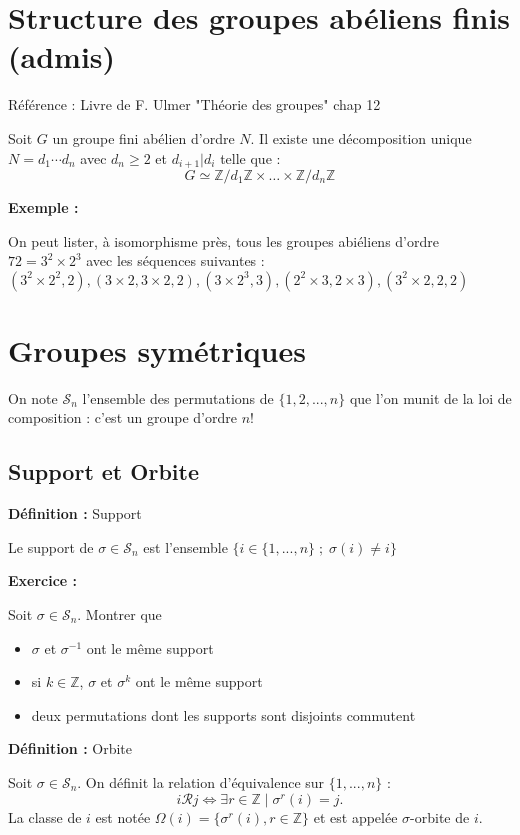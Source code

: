 \documentclass{report}
\newenvironment{definition}[1][]{
    \begin{tcolorbox}[colframe= white]
    \textbf{Définition :} 
    #1 \par
    }
    {\end{tcolorbox}}
\newenvironment{exemple}{\begin{tcolorbox}[colback=gray!10,colframe= white]
    \textbf{Exemple :}
     \par}
    {\end{tcolorbox}}
\newenvironment{exo}{\begin{tcolorbox}[colframe= white]
    \textbf{Exercice :}
    \par}
    {\end{tcolorbox}}
\newcommand{\Z}{\mathbb{Z}}
\newcommand{\sn}{\mathcal{S}_{n}}
\newcommand{\unn}{\{1, ..., n\}}
\begin{document}
\section{Structure des groupes abéliens finis (admis)}
Référence : Livre de F. Ulmer "Théorie des groupes" chap 12


Soit $G$ un groupe fini abélien d'ordre $N$. Il existe une décomposition unique $N=d_1 \cdots d_n$ avec $d_n \geq 2$ et $d_{i+1} | d_i$ telle que : $$G \simeq \mathbb{Z}/d_1\mathbb{Z} \times \dots \times \mathbb{Z}/d_n\mathbb{Z}$$

\begin{exemple}
	On peut lister, à isomorphisme près, tous les groupes abiéliens d'ordre $72=3^2 \times 2^3$ avec les séquences suivantes : $(3^2 \times 2^2, 2) , (3\times 2, 3\times 2, 2), (3\times 2^3, 3), (2^2\times 3, 2\times 3), (3^2\times 2,2,2)$
\end{exemple}

\section{Groupes symétriques}
On note $\sn$  l'ensemble des permutations de $\{1, 2, ..., n\}$ que l'on munit de la loi de composition : c'est un groupe d'ordre $n!$

\subsection{Support et Orbite}
\begin{definition}[Support]
Le support de $\sigma \in \sn$ est l'ensemble $\{i\in\unn\; ; \; \sigma(i)\neq i\}$
\end{definition}

\begin{exo}
Soit $\sigma\in\sn$. Montrer que
\begin{itemize}[label=$\bullet$]
\item $\sigma$ et $\sigma^{-1}$ ont le même support
\item si $k\in\Z$, $\sigma$ et $\sigma^k$ ont le même support
\item deux permutations dont les supports sont disjoints commutent
\end{itemize}
\end{exo}

\begin{definition}[Orbite]
Soit $\sigma\in\sn$. On définit la relation d'équivalence sur $\unn$ : \[i\mathcal{R}j \Longleftrightarrow \exists r\in\Z \;|\;\sigma^r(i)=j.\]
La classe de $i$ est notée $\Omega(i) = \{\sigma^r(i), r\in\Z\}$ et est appelée $\sigma$-orbite de $i$.
\end{definition}
\end{document}

